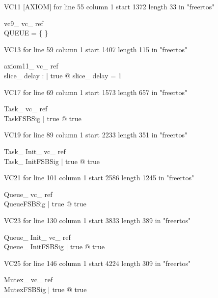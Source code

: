 \documentclass{article}
\begin{document}
VC11 [AXIOM] for line 55 column 1 start 1372 length 33 in "freertos"
\begin{theorem}{ vc9\_ vc\_ ref}\\
 \lnot QUEUE = \{ \} \\

\end{theorem}

VC13 for line 59 column 1 start 1407 length 115 in "freertos"
\begin{theorem}{ axiom11\_ vc\_ ref}\\
 \exists slice\_ delay : \nat | true @ slice\_ delay = 1 \\

\end{theorem}

VC17 for line 69 column 1 start 1573 length 657 in "freertos"
\begin{theorem}{ Task\_ vc\_ ref}\\
 \exists TaskFSBSig | true @ true \\

\end{theorem}

VC19 for line 89 column 1 start 2233 length 351 in "freertos"
\begin{theorem}{ Task\_ Init\_ vc\_ ref}\\
 \exists Task\_ InitFSBSig | true @ true \\

\end{theorem}

VC21 for line 101 column 1 start 2586 length 1245 in "freertos"
\begin{theorem}{ Queue\_ vc\_ ref}\\
 \exists QueueFSBSig | true @ true \\

\end{theorem}

VC23 for line 130 column 1 start 3833 length 389 in "freertos"
\begin{theorem}{ Queue\_ Init\_ vc\_ ref}\\
 \exists Queue\_ InitFSBSig | true @ true \\

\end{theorem}

VC25 for line 146 column 1 start 4224 length 309 in "freertos"
\begin{theorem}{ Mutex\_ vc\_ ref}\\
 \exists MutexFSBSig | true @ true \\

\end{theorem}
\end{document}
